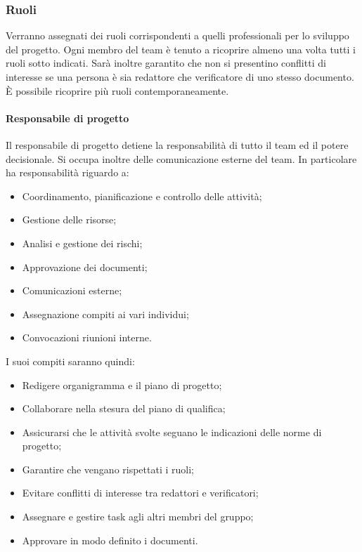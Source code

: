 \subsubsection{Ruoli} \label{sec:ruoli}
	Verranno assegnati dei ruoli corrispondenti a quelli professionali per lo sviluppo del progetto.
	Ogni membro del team è tenuto a ricoprire almeno una volta tutti i ruoli sotto indicati. Sarà inoltre garantito che non si presentino conflitti di interesse se una persona è sia redattore che verificatore di uno stesso documento. È possibile ricoprire più ruoli contemporaneamente.
		\paragraph{Responsabile di progetto}
		Il responsabile di progetto detiene la responsabilità di tutto il team ed il potere decisionale. Si occupa inoltre delle comunicazione esterne del team.
		In particolare ha responsabilità riguardo a:
		\begin{itemize}
			\item Coordinamento, pianificazione e controllo delle attività;
			\item Gestione delle risorse;
			\item Analisi e gestione dei rischi;
			\item Approvazione dei documenti;
			\item Comunicazioni esterne;
			\item Assegnazione compiti ai vari individui;
			\item Convocazioni riunioni interne.
		\end{itemize}
		I suoi compiti saranno quindi:
		\begin{itemize}
			\item Redigere organigramma e il piano di progetto;
			\item Collaborare nella stesura del piano di qualifica;
			\item Assicurarsi che le attività svolte seguano le indicazioni delle norme di progetto;
			\item Garantire che vengano rispettati i ruoli;
			\item Evitare conflitti di interesse tra redattori e verificatori;
			\item Assegnare e gestire task agli altri membri del gruppo;
			\item Approvare in modo definito i documenti.
		\end{itemize}
